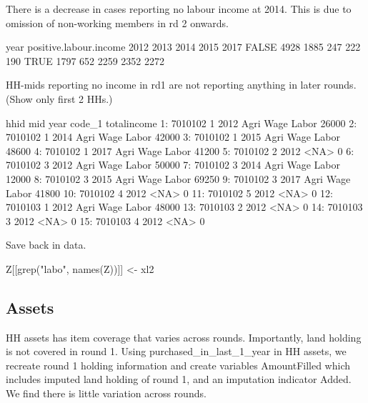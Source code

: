 There is a decrease in cases reporting no labour income at 2014. This is due to omission of non-working members in rd 2 onwards.
\begin{Schunk}
\begin{Soutput}
                      year
positive.labour.income 2012 2013 2014 2015 2017
                 FALSE 4928 1885  247  222  190
                 TRUE  1797  652 2259 2352 2272
\end{Soutput}
\end{Schunk}
\textsf{HH-mid}s reporting no income in rd1 are not reporting anything in later rounds. (Show only first 2 HHs.)
\begin{Schunk}
\begin{Soutput}
       hhid mid year          code_1 totalincome
 1: 7010102   1 2012 Agri Wage Labor       26000
 2: 7010102   1 2014 Agri Wage Labor       42000
 3: 7010102   1 2015 Agri Wage Labor       48600
 4: 7010102   1 2017 Agri Wage Labor       41200
 5: 7010102   2 2012            <NA>           0
 6: 7010102   3 2012 Agri Wage Labor       50000
 7: 7010102   3 2014 Agri Wage Labor       12000
 8: 7010102   3 2015 Agri Wage Labor       69250
 9: 7010102   3 2017 Agri Wage Labor       41800
10: 7010102   4 2012            <NA>           0
11: 7010102   5 2012            <NA>           0
12: 7010103   1 2012 Agri Wage Labor       48000
13: 7010103   2 2012            <NA>           0
14: 7010103   3 2012            <NA>           0
15: 7010103   4 2012            <NA>           0
\end{Soutput}
\end{Schunk}
Save back in data.
\begin{Schunk}
\begin{Sinput}
Z[[grep("labo", names(Z))]] <- xl2
\end{Sinput}
\end{Schunk}


\subsection{Assets}

\textsf{HH assets} has item coverage that varies across rounds. Importantly, land holding is not covered in round 1. Using \textsf{purchased\_in\_last\_1\_year} in \textsf{HH assets}, we recreate round 1 holding information and create variables \textsf{AmountFilled} which includes imputed land holding of round 1, and an imputation indicator \textsf{Added}. We find there is little variation across rounds. 

